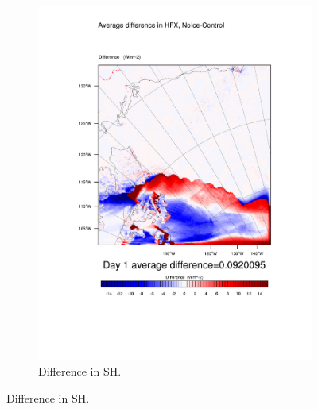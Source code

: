 \begin{figure}
\begin{subfigure}{0.48\textwidth}
		\includegraphics[width=\textwidth]{results/noice/diff_NoIce_HFX_Day1.pdf}
		\caption{Difference in SH.}
		\label{subfig:sh_r2Day1}
	\end{subfigure}
	

\end{figure}
